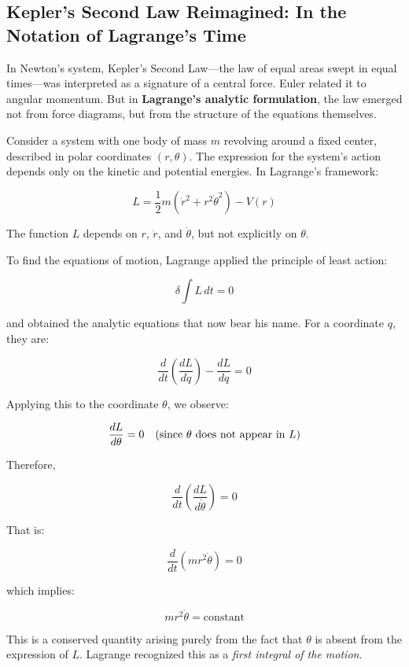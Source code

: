 \subsection{Kepler’s Second Law Reimagined: In the Notation of Lagrange’s Time}

In Newton’s system, Kepler’s Second Law—the law of equal areas swept in equal times—was interpreted as a signature of a central force. Euler related it to angular momentum. But in \textbf{Lagrange’s analytic formulation}, the law emerged not from force diagrams, but from the structure of the equations themselves.

\medskip

Consider a system with one body of mass \( m \) revolving around a fixed center, described in polar coordinates \( (r, \theta) \). The expression for the system’s action depends only on the kinetic and potential energies. In Lagrange’s framework:

\[
L = \frac{1}{2} m \left( \dot{r}^2 + r^2 \dot{\theta}^2 \right) - V(r)
\]

The function \( L \) depends on \( r \), \( \dot{r} \), and \( \dot{\theta} \), but not explicitly on \( \theta \).

\medskip

To find the equations of motion, Lagrange applied the principle of least action:

\[
\delta \int L \, dt = 0
\]

and obtained the analytic equations that now bear his name. For a coordinate \( q \), they are:

\[
\frac{d}{dt} \left( \frac{dL}{d\dot{q}} \right) - \frac{dL}{dq} = 0
\]

Applying this to the coordinate \( \theta \), we observe:

\[
\frac{dL}{d\theta} = 0 \quad \text{(since \( \theta \) does not appear in \( L \))}
\]

Therefore,

\[
\frac{d}{dt} \left( \frac{dL}{d\dot{\theta}} \right) = 0
\]

That is:

\[
\frac{d}{dt} \left( m r^2 \dot{\theta} \right) = 0
\]

which implies:

\[
m r^2 \dot{\theta} = \text{constant}
\]

This is a conserved quantity arising purely from the fact that \( \theta \) is absent from the expression of \( L \). Lagrange recognized this as a \textit{first integral of the motion}.

